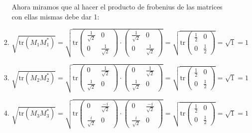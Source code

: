 \documentclass{report}
\begin{document}
\begin{enumerate}
\begin{enumerate}[label=\alph*)]
\begin{enumerate}
    
    Ahora miramos que al hacer el producto de frobenius de las matrices con ellas mismas debe dar 1:
    
    
    
     
    \item $ \sqrt{\text{tr}(M_1 M_1^*)} =\sqrt{\text{tr} \begin{pmatrix}
    \frac{1}{\sqrt{2}}& 0\\
    0 & \frac{1}{\sqrt{2}}
    \end{pmatrix} \cdot \begin{pmatrix}
    \frac{1}{\sqrt{2}} & 0\\
    0 & \frac{1}{\sqrt{2}}
    \end{pmatrix}}= \sqrt{\text{tr} \begin{pmatrix}
    \frac{1}{2} & 0 \\
    0 & \frac{1}{2}
    \end{pmatrix}} = \sqrt{1} = 1$
    
    
    \item $ \sqrt{\text{tr}(M_2 M_2^*)} =\sqrt{\text{tr} \begin{pmatrix}
    0& \frac{1}{\sqrt{2}}\\
    \frac{1}{\sqrt{2}} & 0
    \end{pmatrix} \cdot \begin{pmatrix}
    0& \frac{1}{\sqrt{2}}\\
    \frac{1}{\sqrt{2}} & 0
    \end{pmatrix}}= \sqrt{\text{tr} \begin{pmatrix}
    \frac{1}{2} & 0 \\
    0 & \frac{1}{2}
    \end{pmatrix}} = \sqrt{1} = 1$ 
    
    
    \item $ \sqrt{\text{tr}(M_3 M_3^*)} =\sqrt{\text{tr} \begin{pmatrix}
    0& \frac{-i}{\sqrt{2}}\\
    \frac{i}{\sqrt{2}} & 0
    \end{pmatrix} \cdot \begin{pmatrix}
    0& \frac{-i}{\sqrt{2}}\\
    \frac{i}{\sqrt{2}} & 0
    \end{pmatrix}}= \sqrt{\text{tr} \begin{pmatrix}
    \frac{1}{2} & 0 \\
    0 & \frac{1}{2}
    \end{pmatrix}} = \sqrt{1} = 1$ 
    

\end{enumerate}
\end{enumerate}
\end{enumerate}
\end{document}
